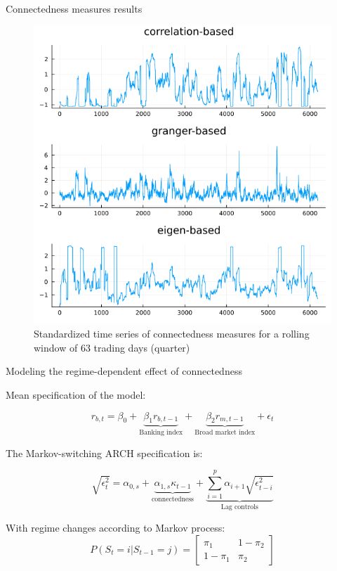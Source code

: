 \documentclass{beamer}
\begin{document}
\begin{frame}{Connectedness measures results}

\begin{figure}[H]
    \caption{Standardized time series of connectedness measures for a rolling window of 63 trading days (quarter)}
    \includegraphics[scale=0.3]{connectmeasures.png}
    \centering
\end{figure}    

\end{frame}    

\begin{frame}{Modeling the regime-dependent effect of connectedness}

Mean specification of the model: 

$$r_{b,t} = \beta_0 + \underbrace{\beta_1 r_{b,t-1}}_{\text{Banking index}} + \underbrace{\beta_2 r_{m,t-1}}_{\text{Broad market index}} + \epsilon_t$$

The Markov-switching ARCH specification is:

$$\sqrt{\epsilon^2_t} = \alpha_{0,s} + \underbrace{\alpha_{1,s}\kappa_{t-1}}_{\text{connectedness}} + \underbrace{\sum_{i=1}^{p} \alpha_{i+1} \sqrt{\epsilon^2_{t-i}}}_{\text{Lag controls}}$$


With regime changes according to Markov process: \begin{equation*}
    P(S_t = i | S_{t-1} = j) = \begin{bmatrix}
      \pi_1 & 1 - \pi_2\\
        1 - \pi_1 & \pi_2
        \end{bmatrix}
\end{equation*}

\end{frame}
\end{document}
